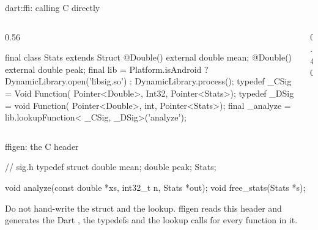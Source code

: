 \documentclass[10pt,aspectratio=169,t]{beamer}
\begin{document}
\begin{frame}[fragile,eyebrow=FFI]{dart:ffi: calling C directly}
  \begin{columns}[T]
    \begin{column}{0.56\textwidth}
\begin{dart}[aboveskip=1mm,belowskip=1mm]
final class Stats extends Struct {
  @Double() external double mean;
  @Double() external double peak;
}
final lib = Platform.isAndroid
    ? DynamicLibrary.open('libsig.so')
    : DynamicLibrary.process();
typedef _CSig = Void Function(
    Pointer<Double>, Int32, Pointer<Stats>);
typedef _DSig = void Function(
    Pointer<Double>, int, Pointer<Stats>);
final _analyze = lib.lookupFunction<
    _CSig, _DSig>('analyze');
\end{dart}
    \end{column}
    \begin{column}{0.40\textwidth}
    \end{column}
  \end{columns}
\end{frame}

\begin{frame}[fragile,eyebrow=FFI]{ffigen: the C header}
\begin{codeblock}[language=C]
// sig.h
typedef struct {
    double mean;
    double peak;
} Stats;

void analyze(const double *xs, int32_t n, Stats *out);
void free_stats(Stats *s);
\end{codeblock}
  \begin{takeaway}{Do not hand-write the struct and the lookup.}
    ffigen reads this header and generates the Dart , the typedefs and the lookup calls for every function in it.
  \end{takeaway}
\end{frame}
\end{document}
